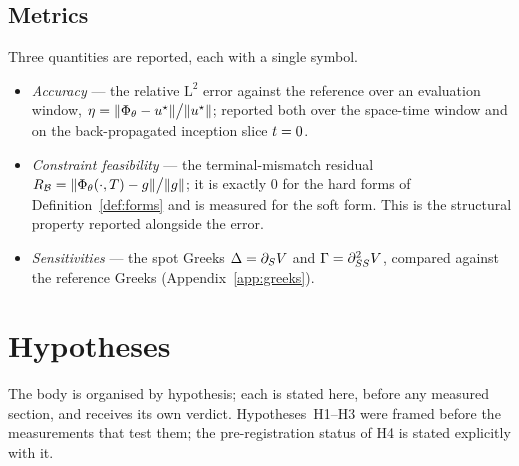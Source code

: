 \documentclass[11pt]{article}
\theoremstyle{plain}
\theoremstyle{definition}
\theoremstyle{remark}
\begin{document}
\subsection{Metrics}\label{sec:metrics}

Three quantities are reported, each with a single symbol.
\begin{itemize}
  \item \emph{Accuracy} --- the relative $\mathrm{L}^{2}$ error against the
    reference over an evaluation window,
    $\eta=\lVert\Phi_{\theta}-u^{\star}\rVert\big/\lVert u^{\star}\rVert$;
    reported both over the space-time window and on the back-propagated inception
    slice $t=0$.
  \item \emph{Constraint feasibility} --- the terminal-mismatch residual
    $R_{\mathcal{B}}=\lVert\Phi_{\theta}(\cdot,T)-g\rVert\big/\lVert g\rVert$;
    it is exactly $0$ for the hard forms of Definition~\ref{def:forms} and is
    measured for the soft form. This is the structural property reported alongside
    the error.
  \item \emph{Sensitivities} --- the spot Greeks $\Delta=\partial_{S}V$
    and $\Gamma=\partial^{2}_{SS}V$, compared against the
    reference Greeks (Appendix~\ref{app:greeks}).
\end{itemize}

\section{Hypotheses}\label{sec:hypotheses}

The body is organised by hypothesis; each is stated here, before any measured
section, and receives its own verdict. Hypotheses~H1--H3 were framed before the
measurements that test them; the pre-registration status of H4 is stated
explicitly with it.
\end{document}
